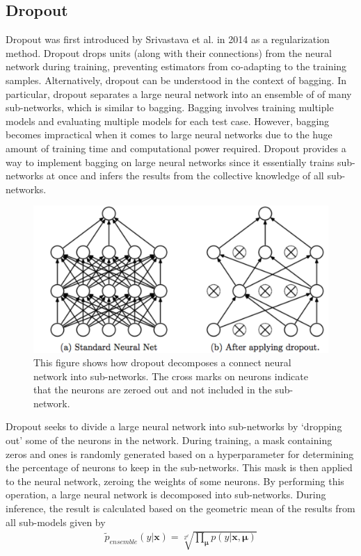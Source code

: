 \subsection{Dropout}
Dropout was first introduced by Srivastava et al. in 2014 
\cite{JMLR:v15:srivastava14a} as a regularization method. Dropout 
drops units (along with their connections) from the neural 
network during training, preventing estimators from 
co-adapting to the training samples. Alternatively, dropout can be understood in the context of bagging. In particular, dropout separates a large neural network
into an ensemble of of many sub-networks, which is similar to bagging. Bagging involves training multiple models and evaluating multiple models for each test case. However, bagging becomes impractical when it comes to large neural networks due to the huge amount of training time and computational power required. Dropout provides a way to implement bagging on large neural networks since it essentially trains sub-networks at once and infers the results from the collective knowledge of all sub-networks.

\begin{figure}[h!]
\centering\includegraphics[scale=0.3,clip]{Graphics/dropout.png}
\caption[Illustration of Dropout]{This figure shows how dropout decomposes a connect neural network into sub-networks. The cross marks on neurons indicate that the neurons are zeroed out and not included in the sub-network.}
\label{fig:dropout}
\end{figure}

Dropout seeks to divide a large neural network into sub-networks by `dropping out' some of the neurons in the network. During training, a mask containing zeros and ones is randomly generated based on a hyperparameter for determining the percentage of neurons to keep in the sub-networks. This mask is then applied to the neural network, zeroing the weights of some neurons. By performing this operation, a large neural network is decomposed into sub-networks. During inference, the result is calculated based on the geometric mean of the results from all sub-models given by
\begin{align}
\tilde{p}_{ensemble}(y | \boldsymbol{x})=\sqrt[2^d]{\prod_{\boldsymbol{\mu}} p(y | \boldsymbol{x},\boldsymbol{\mu})}
\end{align}

